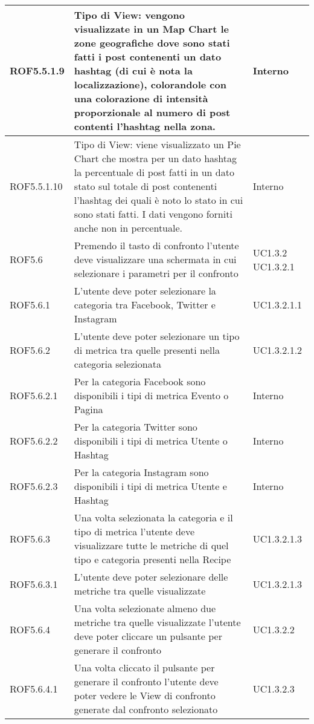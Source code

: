 \begin{center}
\begin{longtable}{| p{2.5cm} | p{8cm} | p{2cm} |}
		\hline
		ROF5.5.1.9  &  Tipo di View: vengono visualizzate in un Map Chart le zone geografiche dove sono stati fatti i post contenenti un dato hashtag (di cui è nota la localizzazione), colorandole con una colorazione di intensità proporzionale al numero di post contenti l'hashtag nella zona. & Interno \\
		\hline
		ROF5.5.1.10  &  Tipo di View: viene visualizzato un Pie Chart che mostra per un dato hashtag la percentuale di post fatti in un dato stato sul totale di post contenenti l'hashtag dei quali è noto lo stato in cui sono stati fatti. I dati vengono forniti anche non in percentuale. & Interno \\
		\hline


		ROF5.6  &  Premendo il tasto di confronto l'utente deve visualizzare una schermata in cui selezionare i parametri per il confronto  &  UC1.3.2 \newline UC1.3.2.1 \\
		\hline
		ROF5.6.1  &  L'utente deve poter selezionare la categoria tra Facebook, Twitter e Instagram  &  UC1.3.2.1.1 \\
		\hline
		ROF5.6.2  &  L'utente deve poter selezionare un tipo di metrica tra quelle presenti nella categoria selezionata  &  UC1.3.2.1.2 \\
		\hline
		ROF5.6.2.1  &  Per la categoria Facebook sono disponibili i tipi di metrica Evento o Pagina  &  Interno \\
		\hline
		ROF5.6.2.2  &  Per la categoria Twitter sono disponibili i tipi di metrica Utente o Hashtag &  Interno \\
		\hline
		ROF5.6.2.3  &  Per la categoria Instagram sono disponibili i tipi di metrica Utente e Hashtag   &  Interno \\
		\hline
		ROF5.6.3  &  Una volta selezionata la categoria e il tipo di metrica l'utente deve visualizzare tutte le metriche di quel tipo e categoria presenti nella Recipe &  UC1.3.2.1.3 \\
		\hline
		ROF5.6.3.1  &  L'utente deve poter selezionare delle metriche tra quelle visualizzate &  UC1.3.2.1.3 \\
		\hline
		ROF5.6.4  &  Una volta selezionate almeno due metriche tra quelle visualizzate l'utente deve poter cliccare un pulsante per generare il confronto  &  UC1.3.2.2 \\
		\hline
		ROF5.6.4.1  &  Una volta cliccato il pulsante per generare il confronto l'utente deve poter vedere le View di confronto generate dal confronto selezionato  &  UC1.3.2.3 \\

\end{longtable}
\end{center}

